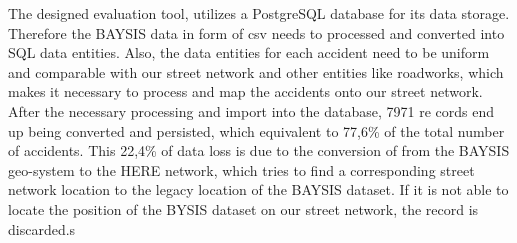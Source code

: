
The designed evaluation tool, utilizes a PostgreSQL database for its data storage. Therefore the BAYSIS data in form of \acrfull{csv} needs to processed and converted into SQL data entities. Also, the data entities for each accident need to be uniform and comparable with our street network and other entities like roadworks, which makes it necessary to process and map the accidents onto our street network. After the necessary processing and import into the database, 7971 re cords end up being converted and persisted, which equivalent to 77,6\% of the total number of accidents. This 22,4\% of data loss is due to the conversion of from the BAYSIS geo-system to the HERE network, which tries to find a corresponding street network location to the legacy location of the BAYSIS dataset. If it is not able to locate the position of the BYSIS dataset on our street network, the record is discarded.s

